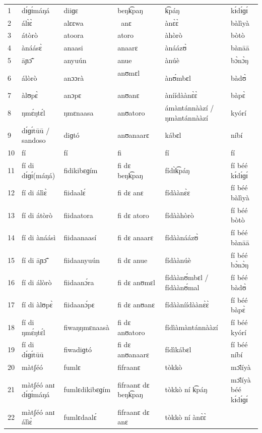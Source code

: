 \begin{landscape}
\begin{center}
{\begin{xtabular}{llllll}
1 & dɪ́ɡɪ́máŋá & diiɡɛ & beŋk͡paŋ   & k͡páŋ  & kɪ́dɪ́ɡɪ́   \\ 
2 & álɪ̀ɛ̀ & alɛɛwa &  anɛ   & ànɛ̀ɛ̀ & bàlìyà  \\ 
3 & átòrò  & atoora &  atoro  & àhòrò  & bòtò  \\ 
4 & ànáásɛ̀ & anaasi  &  anaarɛ   & ànáázʊ̀  & bànāā  \\ 
5 & āɲɔ̃̄ & anyuún &  anue  & ànúè  & bɔ̀nɔ̀ŋ  \\ 
6 & álòrò & anɔɔrà &  anʊmɛl        & ànʊ́mbɛl  & bàdʊ̀  \\ 
7 & àlʊpɛ̀  & anɔpɛ &  anʊanɛ      & àníídàànɛ̀ɛ̀  & bàpɛ̀  \\ 
8 & ŋmɛ́ŋtɛ́l & ŋmɛnaasa  & anʊatoro  & ámàntánnààzí / ŋmàntánnààzí  
& kyórí  \\ 
9 & dɪ́ɡɪ́tūū / sandoso & diɡtó  & anʊanaarɛ  & kábɛl  & níbí  \\ 
10 & fí & fí & fi & fí & fí  \\ 
11 & fí di dɪ́ɡɪ́(máŋá) & fidikibɛɡím & fi dɛ beŋk͡paŋ  & fídɪ̀k͡páŋ  &
fí béé kɪ́dɪ́ɡɪ́   \\ 
12 & fí di álìɛ̀ & fiidaalɛ́ & fi dɛ anɛ & fídàànɛ̀ɛ & fí béé bàlìyà
\\ 
13 & fí di átòrò & fiidaatora & fi dɛ atoro & fídààhòrò & fí béé
bòtò  \\ 
14 & fí di ànáásì & fiidaanaasí & fi dɛ anaarɛ & fídàànáázʊ̀ & fí
béé bànāā  \\ 
15 & fí di āɲɔ̃̄ & fiidaanyuún & fi dɛ anue & fídàànúè & fí béé
bɔ̀nɔ̀ŋ  \\ 
16 & fí di álòrò & fiidaanɔ́ra & fi dɛ anʊmɛl & fídàànʊ́mbɛl /
fídàànʊ́mal & fí béé bàdʊ̀  \\ 
17 & fí di àlʊpɛ̀ & fiidaanɔ́pɛ & fi dɛ anʊanɛ & fídààníídàànɛ̀ɛ̀ & fí
béé bàpɛ̀  \\ 
18 & fí di ŋmɛ́ŋtɛ́l & fiwaŋŋmɛnaasà  & fi dɛ anʊatoro &
fídìàmàntánnààzí   & fí béé kyórí  \\ 
19 & fí di dɪ́ɡɪ́tūū & fiwadiɡtó  & fi dɛ anʊanaarɛ  & fídìkábɛl  & fí
béé níbí  \\ 
20 & màtʃéó & fumlɛ & fifraanɛ & tòkkò & mɔ̄líyà \\ 
21 & màtʃéó anɪ dɪ́ɡɪ́máŋá & fumlɛdikibɛɡím & fifraanɛ dɛ beŋk͡paŋ  &
tòkkò ní k͡páŋ & mɔ̄líyà béé kɪ́dɪ́ɡɪ́  \\ 
22 & màtʃéó anɪ álìɛ̀ & fumlɛdaalɛ́ & fifraanɛ dɛ anɛ & tòkkò ní ànɛ̀ɛ̀

\end{xtabular}}
\end{center}
\end{landscape}

